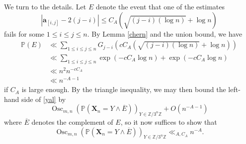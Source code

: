 \documentclass[12pt,a4paper,reqno]{amsart}
\numberwithin{equation}{section}
\theoremstyle{plain}
\theoremstyle{definition}
\renewcommand\P{\mathbb{P}}
\newcommand\Z{\mathbb{Z}}
\renewcommand\a{\mathbf{a}}
\newcommand\X{\mathbf{X}}
\newcommand\Osc{{\operatorname{Osc}}}
\begin{document}
We turn to the details.  Let $E$ denote the event that one of the estimates
\begin{equation}\label{ij}
 |\a_{[i,j]} - 2(j-i)| \leq C_A ( \sqrt{(j-i)(\log n)} + \log n )
\end{equation}
fails for some $1 \leq i \leq j \leq n$.  By Lemma \ref{chern} and the union bound, we have
\begin{equation}\label{ayo}
\begin{split}
\P( E) &\ll \sum_{1 \leq i \leq j \leq n} G_{j-i}( c C_A ( \sqrt{(j-i)(\log n)} + \log n ) ) \\
&\ll \sum_{1 \leq i \leq j \leq n} \exp( - c C_A \log n ) + \exp( - c C_A \log n) \\
&\ll n^2 n^{-c C_A} \\
&\ll n^{-A-1}
\end{split}
\end{equation}
if $C_A$ is large enough.  By the triangle inequality, we may then bound the left-hand side of \eqref{yal} by
$$ 
\Osc_{m,n}\left( \P( \X_n = Y \wedge \overline{E} ) \right)_{Y \in \Z/3^n\Z} + O(n^{-A-1})$$
where $\overline{E}$ denotes the complement of $E$, so it now suffices to show that
$$ 
\Osc_{m,n}\left( \P( \X_n = Y \wedge \overline{E} ) \right)_{Y \in \Z/3^n\Z} \ll_{A,C_A} n^{-A}.$$
\end{document}

